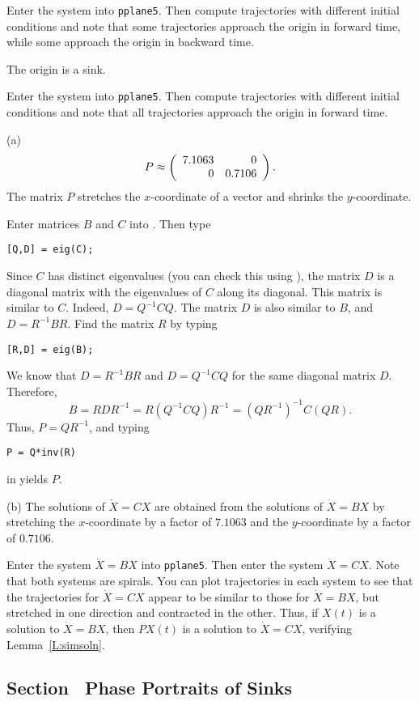 \soln Enter the system into {\tt pplane5}.  Then compute trajectories with
different initial conditions and note that some trajectories approach the
origin in forward time, while some approach the origin in backward time.

 \ans The origin is a sink.

\soln Enter the system into {\tt pplane5}.  Then compute trajectories with
different initial conditions and note that all trajectories approach
the origin in forward time.

(a) \ans
\[
P \approx \left(\begin{array}{rr} 7.1063 & 0\\ 0 &0.7106\end{array}\right).
\]
The matrix $P$ stretches the $x$-coordinate of a vector and shrinks the
$y$-coordinate.

\soln Enter matrices $B$ and $C$ into \Matlabp.  Then type
\begin{verbatim}
[Q,D] = eig(C);
\end{verbatim}
Since $C$ has distinct eigenvalues (you can check this using
\Matlabp), the matrix $D$ is a diagonal matrix with the eigenvalues of
$C$ along its diagonal.  This matrix is similar to $C$.  Indeed, $D =
Q^{-1}CQ$.  The matrix $D$ is also similar to $B$, and $D= R^{-1}BR$.
Find the matrix $R$ by typing
\begin{verbatim}
[R,D] = eig(B);
\end{verbatim}
We know that $D = R^{-1}BR$ and $D = Q^{-1}CQ$ for the same diagonal
matrix $D$.  Therefore,
\[
B = RDR^{-1} = R(Q^{-1}CQ)R^{-1} = (QR^{-1})^{-1}C(QR).
\]
Thus, $P = QR^{-1}$, and typing
\begin{verbatim}
P = Q*inv(R)
\end{verbatim}
in \Matlab yields $P$.

(b) \ans The solutions of $\dot{X} = CX$ are obtained from the solutions
of $\dot{X} = BX$ by stretching the $x$-coordinate by a factor of $7.1063$
and the $y$-coordinate by a factor of $0.7106$.

\soln Enter the system $\dot{X} = BX$ into {\tt pplane5}.  Then enter the
system $\dot{X} = CX$.  Note that both systems are spirals.  You can
plot trajectories in each system to see that the trajectories for
$\dot{X} = CX$ appear to be similar to those for $\dot{X} = BX$, but
stretched in one direction and contracted in the other.  Thus, if
$X(t)$ is a solution to $\dot{X} = BX$, then $PX(t)$ is a solution to
$\dot{X} = CX$, verifying Lemma~\ref{L:simsoln}.



\subsection*{Section~\protect{\ref{S:PlanarSystems}} Phase Portraits of Sinks}

